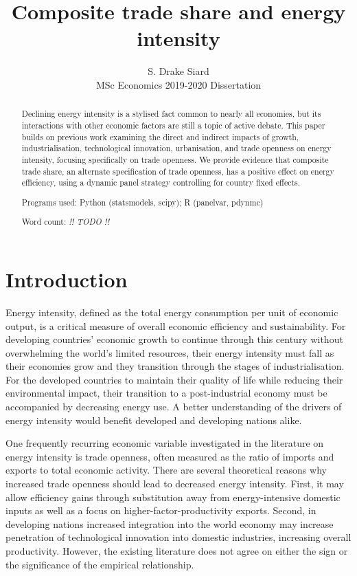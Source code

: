 \documentclass[12pt,a4paper]{article}
\title{Composite trade share and energy intensity}
\author{S. Drake Siard\\
MSc Economics 2019-2020 Dissertation}
\date{}
\newcommand{\pkg}[1]{{\fontseries{b}\selectfont #1}}
\begin{document}
\maketitle

\begin{abstract}
Declining energy intensity is a stylised fact common to nearly all economies, but its interactions with other economic factors are still a topic of active debate.
This paper builds on previous work examining the direct and indirect impacts of growth, industrialisation, technological innovation, urbanisation, and trade openness on energy intensity, focusing specifically on trade openness. 
We provide evidence that composite trade share, an alternate specification of trade openness, has a positive effect on energy efficiency, using a dynamic panel strategy controlling for country fixed effects. 

Programs used: Python (\pkg{statsmodels}, \pkg{scipy}); R (\pkg{panelvar}, \pkg{pdynmc})

Word count: \emph{!! TODO !!}
 
\end{abstract}

\pagebreak

\tableofcontents

\pagebreak

\section{Introduction}\label{sec:introduction}

Energy intensity, defined as the total energy consumption per unit of economic output, is a critical measure of overall economic efficiency and sustainability.
For developing countries' economic growth to continue through this century without overwhelming the world's limited resources, their energy intensity must fall as their economies grow and they transition through the stages of industrialisation.
For the developed countries to maintain their quality of life while reducing their environmental impact, their transition to a post-industrial economy must be accompanied by decreasing energy use.
A better understanding of the drivers of energy intensity would benefit developed and developing nations alike.

One frequently recurring economic variable investigated in the literature on energy intensity is trade openness, often measured as the ratio of imports and exports to total economic activity.
There are several theoretical reasons why increased trade openness should lead to decreased energy intensity.
First, it may allow efficiency gains through substitution away from energy-intensive domestic
inputs as well as a focus on higher-factor-productivity exports. 
Second, in developing nations increased integration into the world economy may increase penetration of technological innovation into domestic industries, increasing overall productivity.
However, the existing literature does not agree on either the sign or the significance of the empirical relationship.
\end{document}
